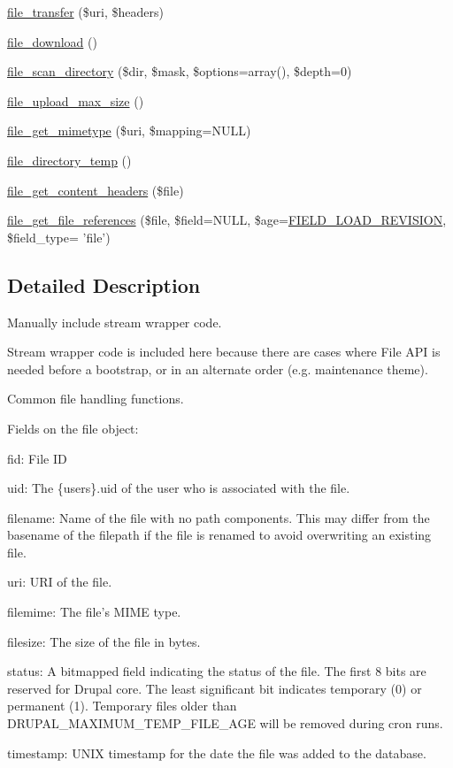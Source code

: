 \begin{DoxyCompactItemize}
\item 
\hyperlink{group__file_ga7b047ab67ab5bb3882d573d7e06ab485}{file\_\-transfer} (\$uri, \$headers)
\item 
\hyperlink{group__file_ga91226299fab7e95a673f6461bbc19b02}{file\_\-download} ()
\item 
\hyperlink{group__file_ga363e988787ffa45bff69ff051eed0615}{file\_\-scan\_\-directory} (\$dir, \$mask, \$options=array(), \$depth=0)
\item 
\hyperlink{group__file_ga7cf25e6a2532a1d022ee1c655f895380}{file\_\-upload\_\-max\_\-size} ()
\item 
\hyperlink{group__file_ga2f3c500f59ecd606e4022ed9d83a1dec}{file\_\-get\_\-mimetype} (\$uri, \$mapping=NULL)
\item 
\hyperlink{group__file_ga250e5cfba54030ab1e5f031608860e42}{file\_\-directory\_\-temp} ()
\item 
\hyperlink{group__file_ga33aed1fe449367d57b8f9a774a449f27}{file\_\-get\_\-content\_\-headers} (\$file)
\item 
\hyperlink{group__file_gad391f02fb9f97bad982b7f66c1ce54d0}{file\_\-get\_\-file\_\-references} (\$file, \$field=NULL, \$age=\hyperlink{group__field_ga6eae4d17256be446f837da1a360f0096}{FIELD\_\-LOAD\_\-REVISION}, \$field\_\-type= 'file')
\end{DoxyCompactItemize}


\subsection{Detailed Description}
Manually include stream wrapper code.

Stream wrapper code is included here because there are cases where File API is needed before a bootstrap, or in an alternate order (e.g. maintenance theme).

Common file handling functions.

Fields on the file object:
\begin{DoxyItemize}
\item fid: File ID
\item uid: The \{users\}.uid of the user who is associated with the file.
\item filename: Name of the file with no path components. This may differ from the basename of the filepath if the file is renamed to avoid overwriting an existing file.
\item uri: URI of the file.
\item filemime: The file's MIME type.
\item filesize: The size of the file in bytes.
\item status: A bitmapped field indicating the status of the file. The first 8 bits are reserved for Drupal core. The least significant bit indicates temporary (0) or permanent (1). Temporary files older than DRUPAL\_\-MAXIMUM\_\-TEMP\_\-FILE\_\-AGE will be removed during cron runs.
\item timestamp: UNIX timestamp for the date the file was added to the database.
\end{DoxyItemize}

